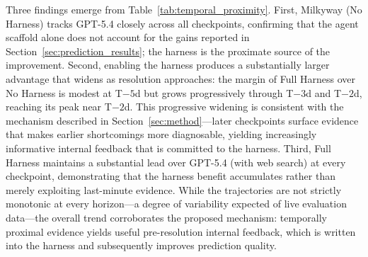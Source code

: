 Three findings emerge from Table~\ref{tab:temporal_proximity}. First, Milkyway (No Harness) tracks GPT-5.4 closely across all checkpoints, confirming that the agent scaffold alone does not account for the gains reported in Section~\ref{sec:prediction_results}; the harness is the proximate source of the improvement. Second, enabling the harness produces a substantially larger advantage that widens as resolution approaches: the margin of Full Harness over No Harness is modest at T$-5$d but grows progressively through T$-3$d and T$-2$d, reaching its peak near T$-2$d. This progressive widening is consistent with the mechanism described in Section~\ref{sec:method}---later checkpoints surface evidence that makes earlier shortcomings more diagnosable, yielding increasingly informative internal feedback that is committed to the harness. Third, Full Harness maintains a substantial lead over GPT-5.4 (with web search) at every checkpoint, demonstrating that the harness benefit accumulates rather than merely exploiting last-minute evidence. While the trajectories are not strictly monotonic at every horizon---a degree of variability expected of live evaluation data---the overall trend corroborates the proposed mechanism: temporally proximal evidence yields useful pre-resolution internal feedback, which is written into the harness and subsequently improves prediction quality.